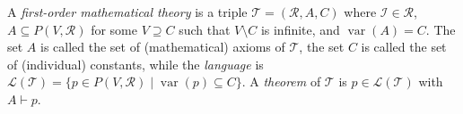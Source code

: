 A \emph{first-order mathematical theory} is a triple $\mathcal{T} = (\mathcal{R}, A, C)$ where $\mathcal{I} \in \mathcal{R}$, $A \subseteq P(V, \mathcal{R})$ for some $V \supseteq C$ such that $V \setminus C$ is infinite, and $\operatorname{var}(A) = C$. The set $A$ is called the set of (mathematical) axioms of $\mathcal{T}$, the set $C$ is called the set of (individual) constants, while the \emph{language} is $\mathcal{L}(\mathcal{T}) = \{p \in P(V, \mathcal{R}) \mid \operatorname{var}(p) \subseteq C\}$. A \emph{theorem} of $\mathcal{T}$ is $p \in \mathcal{L}(\mathcal{T})$ with $A \vdash p$.
